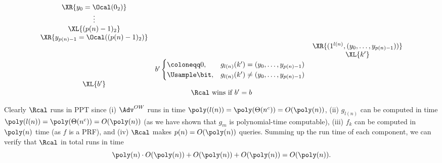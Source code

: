 \begin{answer}[a]
{\[\begin{array}{@{} c c c c c@{}}
            & \XR{y_0= \Ocal(0_2)} & & & \\
            & \vdots & &  & \\
            & \XL{(p(n)-1)_2} & &  & \\
            & \XR{y_{p(n)-1}= \Ocal((p(n)-1)_2)} & & & \\
            & & & \XR{(1^{l(n)}, (y_0,\ldots,y_{p(n)-1}))} & \\
            & & & \XL{k'} & \\
            & & b'\begin{cases}
                \coloneqq 0, & g_{l(n)}(k')=(y_0,\ldots,y_{p(n)-1})\\
                \Usample \bit, &g_{l(n)}(k')\neq (y_0,\ldots,y_{p(n)-1})
            \end{cases} & & \\
            & \XL{b'} & & & \\
            \multicolumn{5}{c}{\text{$\Rcal$ wins if $b' = b$}}
            \end{array}
        \]
        \label{fig:p3-game2}
    }

    Clearly $\Rcal$ runs in PPT since (i) $\Adv^{OW}$ runs in time $\poly(l(n))=\poly(\Theta(n^c))=O(\poly(n))$, (ii) $g_{l(n)}$ can be computed in time $\poly(l(n))=\poly(\Theta(n^c))=O(\poly(n))$ (as we have shown that $g_m$ is polynomial-time computable), (iii) $f_k$ can be computed in $\poly(n)$ time (as $f$ is a PRF), and (iv) $\Rcal$ makes $p(n)=O(\poly(n))$ queries. Summing up the run time of each component, we can verify that $\Rcal$ in total runs in time
    \[
        \poly(n)\cdot O(\poly(n))+ O(\poly(n))+O(\poly(n)) = O(\poly(n)).
    \]
    

\end{answer}
